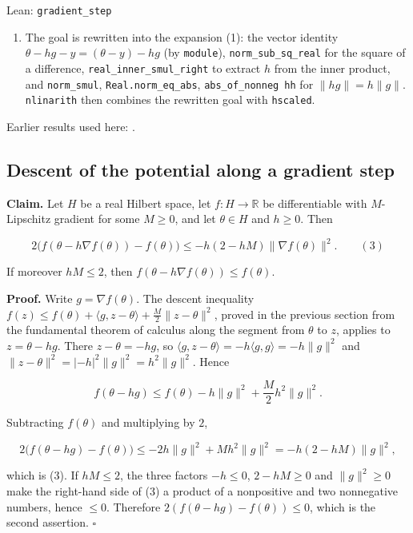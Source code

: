 \documentclass[11pt,a4paper]{report}
\begin{document}
\begin{leanbox}{Lean: \texttt{gradient\_\allowbreak{}step}}
\begin{enumerate}
\item The goal is rewritten into the expansion (1): the vector identity \(\theta-hg-y=(\theta-y)-hg\) (by \texttt{module}), \texttt{norm\_\allowbreak{}sub\_\allowbreak{}sq\_\allowbreak{}real} for the square of a difference, \texttt{real\_\allowbreak{}inner\_\allowbreak{}smul\_\allowbreak{}right} to extract \(h\) from the inner product, and \texttt{norm\_\allowbreak{}smul}, \texttt{Real.\allowbreak{}norm\_\allowbreak{}eq\_\allowbreak{}abs}, \texttt{abs\_\allowbreak{}of\_\allowbreak{}nonneg hh} for \(\|hg\|=h\|g\|\). \texttt{nlinarith} then combines the rewritten goal with \texttt{hscaled}.

\end{enumerate}
\end{leanbox}


Earlier results used here: \cite[Section~3.2.2]{LangevinLean2026ULASC}.
\subsection{\texorpdfstring{Descent of the potential along a gradient step}{Descent of the potential along a gradient step}}
\label{report-step-AverageLMC-GradientStep-lean-2}


\textbf{Claim.} Let \(H\) be a real Hilbert space, let \(f:H\to\mathbb R\) be differentiable with \(M\)-Lipschitz gradient for some \(M\ge0\), and let \(\theta\in H\) and \(h\ge0\). Then


\[2\bigl(f(\theta-h\nabla f(\theta))-f(\theta)\bigr)\le-h(2-hM)\|\nabla f(\theta)\|^2.\qquad(3)\]


If moreover \(hM\le2\), then \(f(\theta-h\nabla f(\theta))\le f(\theta)\).




\textbf{Proof.} Write \(g=\nabla f(\theta)\). The descent inequality \(f(z)\le f(\theta)+\langle g,z-\theta\rangle+\frac M2\|z-\theta\|^2\), proved in the previous section from the fundamental theorem of calculus along the segment from \(\theta\) to \(z\), applies to \(z=\theta-hg\). There \(z-\theta=-hg\), so \(\langle g,z-\theta\rangle=-h\langle g,g\rangle=-h\|g\|^2\) and \(\|z-\theta\|^2=|-h|^2\|g\|^2=h^2\|g\|^2\). Hence


\[f(\theta-hg)\le f(\theta)-h\|g\|^2+\frac M2h^2\|g\|^2.\]


Subtracting \(f(\theta)\) and multiplying by \(2\),


\[2\bigl(f(\theta-hg)-f(\theta)\bigr)\le-2h\|g\|^2+Mh^2\|g\|^2=-h(2-hM)\|g\|^2,\]


which is (3). If \(hM\le2\), the three factors \(-h\le0\), \(2-hM\ge0\) and \(\|g\|^2\ge0\) make the right-hand side of (3) a product of a nonpositive and two nonnegative numbers, hence \(\le0\). Therefore \(2(f(\theta-hg)-f(\theta))\le0\), which is the second assertion. \(\square\)
\end{document}
